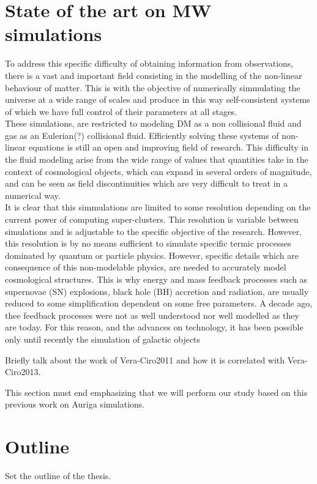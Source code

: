 \section{State of the art on MW simulations}
To address this specific difficulty of obtaining information from observations, there is a vast and important field consisting in the modelling of the non-linear behaviour of matter. This is with the objective of numerically simmulating the universe at a wide range of scales and produce in this way self-consistent systems of which we have  full control of their parameters at all stages.\\

These simulations, are restricted to modeling DM as a non collisional fluid and gas as an Eulerian(?) collisional fluid. Efficiently solving these systems of non-linear equations is still an open and improving field of research. This difficulty in the fluid modeling arise from the wide range of values that quantities take in the context of cosmological objects, which can expand in several orders of magnitude, and can be seen as field discontinuities which are very difficult to treat in a numerical way.\\

It is clear that this simmulations are limited to some resolution depending on the current power of computing super-clusters. This resolution is variable between simulations and is adjustable to the specific objective of the research. However, this resolution is by no means sufficient to simulate specific termic processes dominated by quantum or particle physics. However, specific details which are consequence of this non-modelable physics, are needed to accurately model cosmological structures. This is why energy and mass feedback processes such as supernovae (SN) explosions, black hole (BH) accretion and radiation, are usually reduced to some simplification dependent on some free parameters. A decade ago, thee feedback processes were not as well understood nor well modelled as they are today. For this reason, and the advances on technology, it has been possible only until recently the simulation of galactic objects 

Briefly talk about the work of Vera-Ciro2011 and how it is correlated with Vera-Ciro2013.

This section must end emphasizing that we will perform our study based on this previous work on Auriga simulations.

\section{Outline}

Set the outline of the thesis.